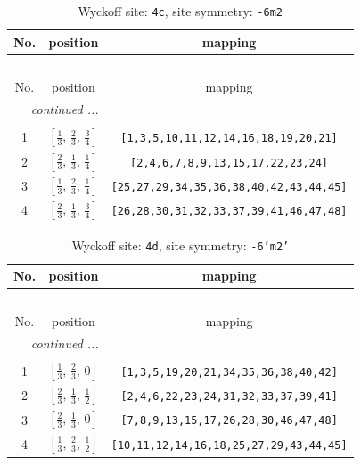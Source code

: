 \documentclass[fleqn,8pt]{jsarticle}
\begin{document}
\renewcommand{\arraystretch}{1.2}
\begin{longtable}{ccc}
\caption{Wyckoff site: {\tt 4c}, site symmetry: {\tt -6m2}}
 \\
 \hline \hline
No. & position & mapping \\ \hline \endfirsthead

\multicolumn{2}{l}{\tablename\ \thetable{}} \\
 \hline \hline
No. & position & mapping \\ \hline \endhead

 \hline \hline
\multicolumn{2}{r}{\footnotesize\it continued ...} \\ \endfoot

 \hline \hline
\multicolumn{2}{r}{} \\ \endlastfoot

1 & $\left[ \frac{1}{3},\, \frac{2}{3},\, \frac{3}{4} \right]$ & {\tt [1,3,5,10,11,12,14,16,18,19,20,21]} \\ \hline
2 & $\left[ \frac{2}{3},\, \frac{1}{3},\, \frac{1}{4} \right]$ & {\tt [2,4,6,7,8,9,13,15,17,22,23,24]} \\ \hline
3 & $\left[ \frac{1}{3},\, \frac{2}{3},\, \frac{1}{4} \right]$ & {\tt [25,27,29,34,35,36,38,40,42,43,44,45]} \\ \hline
4 & $\left[ \frac{2}{3},\, \frac{1}{3},\, \frac{3}{4} \right]$ & {\tt [26,28,30,31,32,33,37,39,41,46,47,48]} \\
\end{longtable}
\renewcommand{\arraystretch}{1.2}
\begin{longtable}{ccc}
\caption{Wyckoff site: {\tt 4d}, site symmetry: {\tt -6'm2'}}
 \\
 \hline \hline
No. & position & mapping \\ \hline \endfirsthead

\multicolumn{2}{l}{\tablename\ \thetable{}} \\
 \hline \hline
No. & position & mapping \\ \hline \endhead

 \hline \hline
\multicolumn{2}{r}{\footnotesize\it continued ...} \\ \endfoot

 \hline \hline
\multicolumn{2}{r}{} \\ \endlastfoot

1 & $\left[ \frac{1}{3},\, \frac{2}{3},\, 0 \right]$ & {\tt [1,3,5,19,20,21,34,35,36,38,40,42]} \\ \hline
2 & $\left[ \frac{2}{3},\, \frac{1}{3},\, \frac{1}{2} \right]$ & {\tt [2,4,6,22,23,24,31,32,33,37,39,41]} \\ \hline
3 & $\left[ \frac{2}{3},\, \frac{1}{3},\, 0 \right]$ & {\tt [7,8,9,13,15,17,26,28,30,46,47,48]} \\ \hline
4 & $\left[ \frac{1}{3},\, \frac{2}{3},\, \frac{1}{2} \right]$ & {\tt [10,11,12,14,16,18,25,27,29,43,44,45]} \\
\end{longtable}
\end{document}

